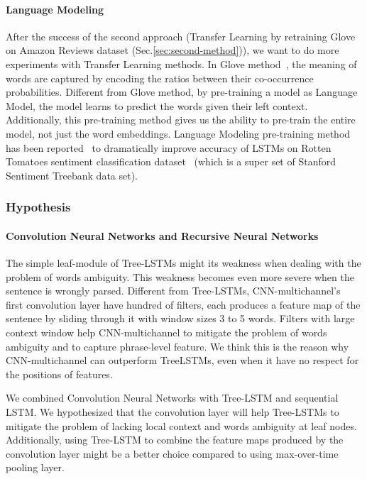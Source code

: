 \paragraph{Language Modeling}
After the success of the second approach (Transfer Learning by retraining Glove on Amazon Reviews dataset (Sec.\ref{sec:second-method})), we want to do more experiments with Transfer Learning methods.
In Glove method~\cite{glove}, the meaning of words are captured by encoding the ratios between their co-occurrence probabilities.
Different from Glove method, by pre-training a model as Language Model, the model learns to predict the words given their left context.
Additionally, this pre-training method gives us the ability to pre-train the entire model, not just the word embeddings. 
Language Modeling pre-training method has been reported~\cite{semisup-seq2seq} to dramatically improve accuracy of LSTMs on Rotten Tomatoes sentiment classification dataset~\cite{Rotten-Tomato} (which is a super set of Stanford Sentiment Treebank data set).

\subsubsection{Hypothesis}
\paragraph{Convolution Neural Networks and Recursive Neural Networks}
The simple leaf-module of Tree-LSTMs might its weakness when dealing with the problem of words ambiguity.
This weakness becomes even more severe when the sentence is wrongly parsed.
Different from Tree-LSTMs, CNN-multichannel's~\cite{KimCNN} first convolution layer have hundred of filters, each produces a feature map of the sentence by sliding through it with window sizes 3 to 5 words.
Filters with large context window help CNN-multichannel to mitigate the problem of words ambiguity and to capture phrase-level feature.
We think this is the reason why CNN-multichannel  can outperform TreeLSTMs, even when it have no respect for the positions of features. 

We combined Convolution Neural Networks with Tree-LSTM and sequential LSTM.
We hypothesized that the convolution layer will help Tree-LSTMs to mitigate the problem of lacking local context and words ambiguity at leaf nodes.
Additionally, using Tree-LSTM to combine the feature maps produced by the convolution layer might be a better choice compared to using max-over-time pooling layer.
